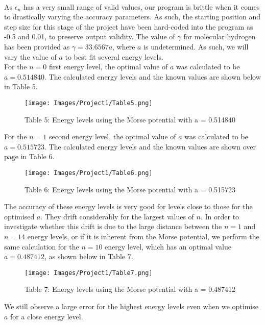 \documentclass[10pt]{article}
\begin{document}
{\paragraph{}
As $\epsilon_n$ has a very small range of valid values, our program is brittle when it comes to drastically varying the accuracy parameters. As such, the starting position and step size for this stage of the project have been hard-coded into the program as -0.5 and 0.01, to preserve output validity. The value of $\gamma$ for molecular hydrogen has been provided as $\gamma = 33.6567 a$, where $a$ is undetermined. As such, we will vary the value of $a$ to best fit several energy levels. \\
For the $n=0$ first energy level, the optimal value of $a$ was calculated to be $a=0.514840$. The calculated energy levels and the known values are shown below in Table 5.

\begin{figure}[h]
\texttt{[image: Images/Project1/Table5.png]} \centering \caption*{\footnotesize Table 5: Energy levels using the Morse potential with a = 0.514840} \end{figure}

For the $n=1$ second energy level, the optimal value of $a$ was calculated to be $a = 0.515723$. The calculated energy levels and the known values are shown over page in Table 6.

\begin{figure}[!h]
\texttt{[image: Images/Project1/Table6.png]} \centering \caption*{\footnotesize Table 6: Energy levels using the Morse potential with a = 0.515723} \end{figure}

The accuracy of these energy levels is very good for levels close to those for the optimised $a$. They drift considerably for the largest values of $n$. In order to investigate whether this drift is due to the large distance between the $n=1$ and $n=14$ energy levels, or if it is inherent from the Morse potential, we perform the same calculation for the $n=10$ energy level, which has an optimal value $a=0.487412$, as shown below in Table 7.

\begin{figure}[!h]
\texttt{[image: Images/Project1/Table7.png]} \centering \caption*{\footnotesize Table 7: Energy levels using the Morse potential with a = 0.487412} \end{figure}

We still observe a large error for the highest energy levels even when we optimise $a$ for a close energy level.

}
\end{document}

